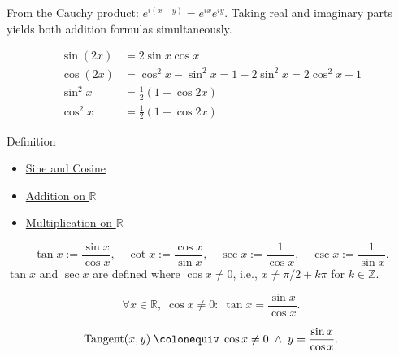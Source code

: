 \begin{remark*}
From the Cauchy product: $e^{i(x+y)} = e^{ix}e^{iy}$. Taking real
and imaginary parts yields both addition formulas simultaneously.
\end{remark*}

\begin{remark*}
\begin{align*}
  \sin(2x) &= 2\sin x \cos x \\
  \cos(2x) &= \cos^2 x - \sin^2 x = 1 - 2\sin^2 x = 2\cos^2 x - 1 \\
  \sin^2 x &= \tfrac{1}{2}(1 - \cos 2x) \\
  \cos^2 x &= \tfrac{1}{2}(1 + \cos 2x)
\end{align*}
\end{remark*}


\begin{definitionbox}{Definition}

\begin{dependencies}
\begin{itemize}
  \item \hyperref[def:sine-cosine]{Sine and Cosine}
  \item \hyperref[def:addition-on-r]{Addition on $\mathbb{R}$}
  \item \hyperref[def:multiplication-on-r]{Multiplication on $\mathbb{R}$}
\end{itemize}
\end{dependencies}
\begin{definition}
\label{def:other-trig}
\[
  \tan x := \frac{\sin x}{\cos x},\quad
  \cot x := \frac{\cos x}{\sin x},\quad
  \sec x := \frac{1}{\cos x},\quad
  \csc x := \frac{1}{\sin x}.
\]
$\tan x$ and $\sec x$ are defined where $\cos x \neq 0$,
i.e., $x \neq \pi/2 + k\pi$ for $k \in \mathbb{Z}$.
\end{definition}
\end{definitionbox}\begin{remark*}
\[
  \forall x\in\mathbb{R},\;\cos x\neq 0:\;
  \tan x = \frac{\sin x}{\cos x}.
\]
\end{remark*}

\begin{remark*}
\[
  \operatorname{Tangent}(x,y)
  \;\colonequiv\;
  \cos x \neq 0 \;\wedge\; y = \frac{\sin x}{\cos x}.
\]
\end{remark*}

